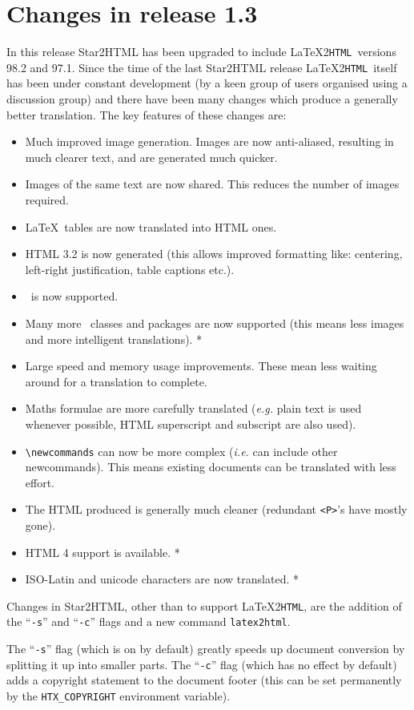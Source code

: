 \documentclass[twoside,11pt]{article}
\newcommand{\xlabel}[1]{}
\newcommand{\latextohtml}{\LaTeX2\texttt{HTML}}
\renewcommand{\_}{\texttt{\symbol{95}}}
\begin{document}
\section{\xlabel{changes13}\label{changes13}Changes in release 1.3}
In this release Star2HTML has been upgraded to include \latextohtml\
versions 98.2 and 97.1. Since the time of the last Star2HTML release
\latextohtml\ itself has been under constant development (by a keen
group of users organised using a discussion group) and there have been
many changes which produce a generally better translation. The key
features of these changes are:
\begin{itemize}
\item Much improved image generation. Images are now anti-aliased,
      resulting in much clearer text, and are generated much quicker.
\item Images of the same text are now shared. This reduces the number
      of images required.
\item \LaTeX\ tables are now translated into HTML ones.
\item HTML 3.2 is now generated (this allows improved formatting like:
      centering, left-right justification, table captions etc.).
\item \LaTeXe\ is now supported.
\item Many more \LaTeXe\ classes and packages are now supported (this
      means less images and more intelligent translations). *
\item Large speed and memory usage improvements. These mean
      less waiting around for a translation to complete.
\item Maths formulae are more carefully translated (\textit{e.g.}
      plain text is used whenever possible, HTML superscript and
      subscript are also used).
\item \verb#\newcommands# can now be more complex (\textit{i.e.} can
      include other newcommands). This means existing documents can be
      translated with less effort.
\item The HTML produced is generally much cleaner (redundant \verb#<P>#'s
      have mostly gone).
\item HTML 4 support is available. *
\item ISO-Latin and unicode characters are now translated. *
\end{itemize}

Changes in Star2HTML, other than to support \latextohtml, are the
addition of the ``\verb#-s#'' and ``\verb#-c#'' flags 
and a new command \verb#latex2html#.

The ``\verb#-s#'' flag (which is on by default) greatly speeds up
document conversion by splitting it up into smaller parts.
The ``\verb#-c#'' flag (which has no effect by default) adds a
copyright statement to the document footer (this can be set
permanently by the \verb#HTX_COPYRIGHT# environment variable).
\end{document}

